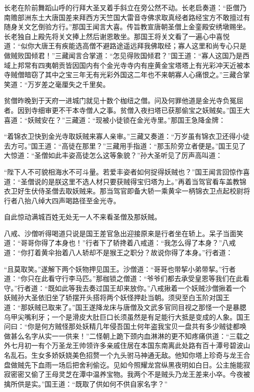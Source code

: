 \documentclass[12pt,UTF8]{ctexbook}
\begin{document}
长老在阶前舞蹈山呼的行拜大圣叉着手斜立在旁公然不动。长老启奏道：“臣僧乃南赡部洲东土大唐国差来拜西方天竺国大雷音寺佛求取真经者路经宝方不敢擅过有随身关文乞倒验方行。”那国王闻言大喜。传旨教宣唐朝圣僧上金銮殿安绣墩赐坐。长老独自上殿先将关文捧上然后谢恩敢坐。那国王将关文看了一遍心中喜悦道：“似你大唐王有疾能选高僧不避路途遥远拜我佛取经；寡人这里和尚专心只是做贼败国倾君！”三藏闻言合掌道：“怎见得败国倾君？”国王道：“寡人这国乃是西域上邦常有四夷朝贡皆因国内有个金光寺寺内有座黄金宝塔塔上有光彩冲天近被本寺贼僧暗窃了其中之宝三年无有光彩外国这二年也不来朝寡人心痛恨之。”三藏合掌笑道：“万岁差之毫厘失之千里矣。

贫僧昨晚到于天府一进城门就见十数个枷纽之僧。问及何罪他道是金光寺负冤屈者。因到寺细审更不干本寺僧人之事。贫僧入夜扫塔已获那偷宝之妖贼矣。”国王大喜道：“妖贼安在？”三藏道：“现被小徒锁在金光寺里。”那国王急降金牌：

“着锦衣卫快到金光寺取妖贼来寡人亲审。”三藏又奏道：“万岁虽有锦衣卫还得小徒去方可。”国王道：“高徒在那里？”三藏用手指道：“那玉阶旁立者便是。”国王见了大惊道：“圣僧如此丰姿高徒怎么这等象貌？”孙大圣听见了厉声高叫道：

“陛下人不可貌相海水不可斗量。若爱丰姿者如何捉得妖贼也？”国王闻言回惊作喜道：“圣僧说的是朕这里不选人材只要获贼得宝归塔为上。”再着当驾官看车盖教锦衣卫好生伏侍圣僧去取妖贼来。那当驾官即备大轿一乘黄伞一柄锦衣卫点起校尉将行者八抬八绰大四声喝路径至金光寺。

自此惊动满城百姓无处无一人不来看圣僧及那妖贼。

八戒、沙僧听得喝道只说是国王差官急出迎接原来是行者坐在轿上。呆子当面笑道：“哥哥你得了本身也！”行者下了轿搀着八戒道：“我怎么得了本身？”八戒道：“你打着黄伞抬着八人轿却不是猴王之职分？故说你得了本身。”行者道：

“且莫取笑。”遂解下两个妖物押见国王。沙僧道：“哥哥也带挈小弟带挈。”行者道：“你只在此看守行李马匹。”那枷锁之僧道：“爷爷们都去承受皇恩等我们在此看守。”行者道：“既如此等我去奏过国王却来放你。”八戒揪着一个妖贼沙僧揪着一个妖贼孙大圣依旧坐了轿摆开头搭将两个妖怪押赴当朝。须臾至白玉阶对国王道：“那妖贼已取来了。”国王遂降龙床与唐僧及文武多官同目视之那怪一个是暴腮乌甲尖嘴利牙；一个是滑皮大肚巨口长须虽然是有足能行大抵是变成的人象。国王问曰：“你是何方贼怪那处妖精几年侵吾国土何年盗我宝贝一盘共有多少贼徒都唤做甚么名字从实一一供来！”二怪朝上跪下颈内血淋淋的更不知疼痛供道：“三载之外七月初一有个万圣龙王帅领许多亲戚住居在本国东南离此处路有百十潭号碧波山名乱石。生女多娇妖娆美色招赘一个九头驸马神通无敌。他知你塔上珍奇与龙王合盘做贼先下血雨一场后把舍利偷讫。见如今照耀龙宫纵黑夜明如白日。公主施能寂寂密密又偷了王母灵芝在潭中温养宝物。我两个不是贼头乃龙王差来小卒。今夜被擒所供是实。”国王道：“既取了供如何不供自家名字？”
\end{document}
